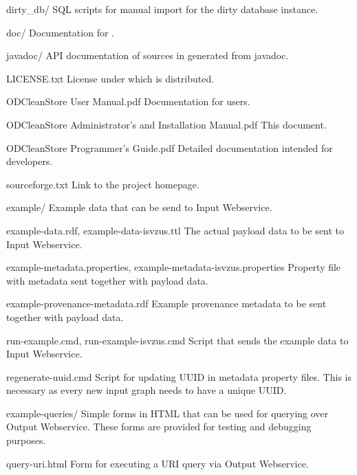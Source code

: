\begin{dirlistbrief}
\begin{dirlist}
            \item[dirty\_db/] SQL scripts for manual import for the dirty database instance.
        \end{dirlist}
    \item[doc/] Documentation for \odcs.
        \begin{dirlist}
            \item[javadoc/] API documentation of \odcs sources in generated from javadoc.
            \item[LICENSE.txt] License under which \odcs is distributed.
            \item[ODCleanStore User Manual.pdf] Documentation for \odcs users.
            \item[ODCleanStore Administrator's and Installation Manual.pdf] This document.
            \item[ODCleanStore Programmer's Guide.pdf] Detailed documentation intended for developers.
            \item[sourceforge.txt] Link to the project homepage.
        \end{dirlist}
    \item[example/] Example data that can be send to Input Webservice.
        \begin{dirlist}
            \item[example-data.rdf, example-data-isvzus.ttl] The actual payload data to be sent to Input Webservice.
            \item[example-metadata.properties, example-metadata-isvzus.properties] Property file with metadata sent together with payload data.
            \item[example-provenance-metadata.rdf] Example provenance metadata to be sent together with payload data.
            \item[run-example.cmd, run-example-isvzus.cmd] Script that sends the example data to Input Webservice.
            \item[regenerate-uuid.cmd] Script for updating UUID in metadata property files. This is necessary as every new input graph needs to have a unique UUID.
        \end{dirlist}
    \item[example-queries/] Simple forms in HTML that can be used for querying over Output Webservice. These forms are provided for testing and debugging purposes.
        \begin{dirlist}
            \item[query-uri.html] Form for executing a URI query via Output Webservice.

\end{dirlist}
\end{dirlistbrief}
